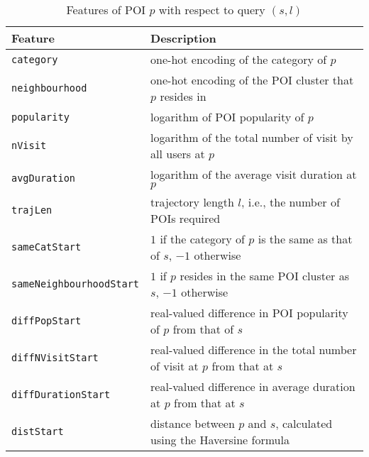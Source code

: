 \begin{table*}[ht]
\caption{Features of POI $p$ with respect to query $(s,l)$}
\label{tab:poifeature}
\centering


\setlength{\tabcolsep}{10pt} %
\begin{tabular}{l|l} \hline
\textbf{Feature}       & \textbf{Description} \\ \hline
\texttt{category}      & one-hot encoding of the category of $p$ \\
\texttt{neighbourhood} & one-hot encoding of the POI cluster that $p$ resides in \\
\texttt{popularity}    & logarithm of POI popularity of $p$ \\
\texttt{nVisit}        & logarithm of the total number of visit by all users at $p$ \\
\texttt{avgDuration}  & logarithm of the average visit duration at $p$ \\
\hline

\texttt{trajLen}           & trajectory length $l$, i.e., the number of POIs required \\
\texttt{sameCatStart}      & $1$ if the category of $p$ is the same as that of $s$, $-1$ otherwise \\
\texttt{sameNeighbourhoodStart} & $1$ if $p$ resides in the same POI cluster as $s$, $-1$ otherwise \\
\texttt{diffPopStart}    & real-valued difference in POI popularity of $p$ from that of $s$ \\
\texttt{diffNVisitStart}        & real-valued difference in the total number of visit at $p$ from that at $s$ \\
\texttt{diffDurationStart}  & real-valued difference in average duration at $p$ from that at $s$ \\
\texttt{distStart}          & distance between $p$ and $s$, calculated using the Haversine formula \\
\hline
\end{tabular}
\end{table*}



